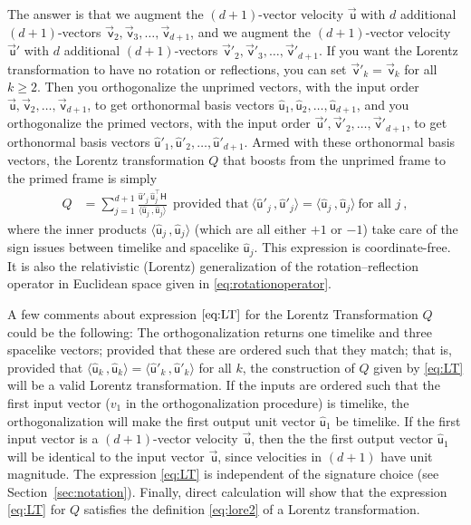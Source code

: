 \documentclass{article}
\newcommand{\metric}{\mathsf{H}}
\newcommand\upvec[1]{\!\vec{\,\mathrm{#1}}}
\newcommand{\Lvec}[1]{\upvec{\mathsf{#1}}} %
\newcommand{\Lhat}[1]{\hat{\mathsf{#1}}} %
\newcommand{\inner}[2]{\langle{#1}\,,{#2}\rangle}
\newcommand{\plus}{\!+\!} %
\newcommand{\secref}[1]{Section~\ref{#1}}
\begin{document}
The answer is that we augment the $(d\plus1)$-vector velocity $\Lvec{u}$ with $d$ additional $(d\plus1)$-vectors $\Lvec{v}_2,\Lvec{v}_3,\ldots,\Lvec{v}_{d+1}$, and we augment the $(d\plus1)$-vector velocity $\Lvec{u}'$ with $d$ additional $(d\plus1)$-vectors $\Lvec{v}'_2,\Lvec{v}'_3,\ldots,\Lvec{v}'_{d+1}$.
If you want the Lorentz transformation to have no rotation or reflections, you can set $\Lvec{v}'_k=\Lvec{v}_k$ for all $k\geq 2$.
Then you orthogonalize the unprimed vectors, with the input order $\Lvec{u},\Lvec{v}_2,\ldots,\Lvec{v}_{d+1}$, to get orthonormal basis vectors $\Lhat{u}_1,\Lhat{u}_2,\ldots,\Lhat{u}_{d+1}$, and you orthogonalize the primed vectors, with the input order $\Lvec{u}',\Lvec{v}'_2,\ldots,\Lvec{v}'_{d+1}$, to get orthonormal basis vectors $\Lhat{u}'_1,\Lhat{u}'_2,\ldots,\Lhat{u}'_{d+1}$.
Armed with these orthonormal basis vectors, the Lorentz transformation $Q$ that boosts from the unprimed frame to the primed frame is simply
\begin{align}
    Q &= \sum_{j=1}^{d+1} \frac{\Lhat{u}'_j\,\Lhat{u}_j^\top\metric}{\inner{\Lhat{u}_j}{\Lhat{u}_j}} ~~ \mbox{provided that} ~ \inner{\Lhat{u}'_j}{\Lhat{u}'_j} = \inner{\Lhat{u}_j}{\Lhat{u}_j} ~ \mbox{for all $j$} ~,\label{eq:LT}
\end{align}
where the inner products $\inner{\Lhat{u}_j}{\Lhat{u}_j}$ (which are all either $+1$ or $-1$) take care of the sign issues between timelike and spacelike $\Lhat{u}_j$.
This expression is coordinate-free.
It is also the relativistic (Lorentz) generalization of the rotation--reflection operator in Euclidean space given in \eqref{eq:rotationoperator}.

A few comments about expression $\eqref{eq:LT}$ for the Lorentz Transformation $Q$ could be the following:
The orthogonalization returns one timelike and three spacelike vectors;
provided that these are ordered such that they match; that is, provided that $\inner{\Lhat{u}_k}{\Lhat{u}_k}=\inner{\Lhat{u}'_k}{\Lhat{u}'_k}$ for all $k$, the construction of $Q$ given by \eqref{eq:LT} will be a valid Lorentz transformation.
If the inputs are ordered such that the first input vector ($v_1$ in the orthogonalization procedure) is timelike, the orthogonalization will make the first output unit vector $\Lhat{u}_1$ be timelike.
If the first input vector is a $(d\plus1)$-vector velocity $\Lvec{u}$, then the the first output vector $\Lhat{u}_1$ will be identical to the input vector $\Lvec{u}$, since velocities in $(d\plus1)$ have unit magnitude.
The expression \eqref{eq:LT} is independent of the signature choice (see \secref{sec:notation}).
Finally, direct calculation will show that the expression \eqref{eq:LT} for $Q$ satisfies the definition \eqref{eq:lore2} of a Lorentz transformation.
\end{document}

